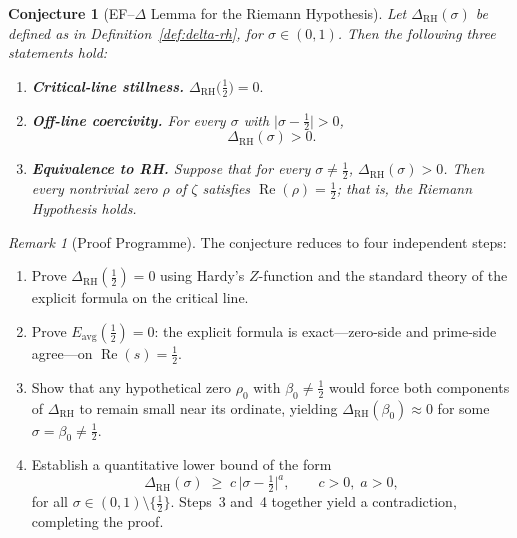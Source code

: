 \documentclass[11pt]{article}
\newtheorem{conjecture}[theorem]{Conjecture}
\theoremstyle{remark}
\newtheorem{remark}[theorem]{Remark}
\DeclareMathOperator{\Rea}{Re}
\begin{document}
\begin{conjecture}[EF--$\Delta$ Lemma for the Riemann Hypothesis]
\label{conj:ef-delta}
Let\/ $\Delta_{\mathrm{RH}}(\sigma)$ be defined as in
Definition~\ref{def:delta-rh}, for $\sigma\in(0,1)$.
Then the following three statements hold:
\begin{enumerate}
\item[\textbf{(1)}]
  \textbf{Critical-line stillness.}\;
  $\Delta_{\mathrm{RH}}\!\bigl(\tfrac{1}{2}\bigr) = 0.$

\item[\textbf{(2)}]
  \textbf{Off-line coercivity.}\;
  For every $\sigma$ with
  $\lvert\sigma - \tfrac{1}{2}\rvert > 0$,
  \[
    \Delta_{\mathrm{RH}}(\sigma) > 0.
  \]

\item[\textbf{(3)}]
  \textbf{Equivalence to RH.}\;
  Suppose that for every $\sigma\neq\tfrac{1}{2}$,
  $\Delta_{\mathrm{RH}}(\sigma)>0$.
  Then every nontrivial zero $\rho$ of $\zeta$ satisfies
  $\Rea(\rho)=\tfrac{1}{2}$; that is, the Riemann Hypothesis holds.
\end{enumerate}
\end{conjecture}


\begin{remark}[Proof Programme]
\label{rem:proof-programme}
The conjecture reduces to four independent steps:
\begin{enumerate}
\item[\textbf{Step 1.}]
  Prove $\Delta_{\mathrm{RH}}(\tfrac{1}{2})=0$ using Hardy's
  $Z$-function and the standard theory of the explicit formula
  on the critical line.

\item[\textbf{Step 2.}]
  Prove $E_{\mathrm{avg}}(\tfrac{1}{2})=0$: the explicit formula is
  exact---zero-side and prime-side agree---on $\Rea(s)=\tfrac{1}{2}$.

\item[\textbf{Step 3.}]
  Show that any hypothetical zero $\rho_{0}$ with
  $\beta_{0}\neq\tfrac{1}{2}$ would force both components of
  $\Delta_{\mathrm{RH}}$ to remain small near its ordinate, yielding
  $\Delta_{\mathrm{RH}}(\beta_{0})\approx 0$ for some
  $\sigma=\beta_{0}\neq\tfrac{1}{2}$.

\item[\textbf{Step 4.}]
  Establish a quantitative lower bound of the form
  \[
    \Delta_{\mathrm{RH}}(\sigma)
    \;\geq\;
    c\,\bigl\lvert\sigma - \tfrac{1}{2}\bigr\rvert^{a},
    \qquad c>0,\; a>0,
  \]
  for all $\sigma\in(0,1)\setminus\{\tfrac{1}{2}\}$.
  Steps~3 and~4 together yield a contradiction, completing
  the proof.
\end{enumerate}
\end{remark}
\end{document}
